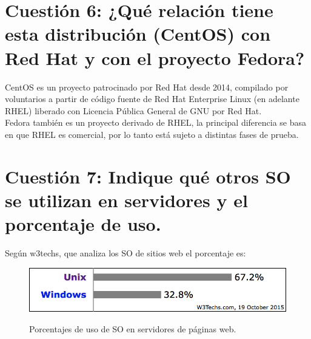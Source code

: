 \section{Cuestión 6: ¿Qué relación tiene esta distribución (CentOS) con Red Hat y con el proyecto Fedora?}
CentOS es un proyecto patrocinado por Red Hat desde 2014, compilado por voluntarios a partir de código fuente de Red Hat Enterprise Linux (en adelante RHEL) liberado con Licencia Pública General de GNU por Red Hat. \cite{19} \\
Fedora también es un proyecto derivado de RHEL, la principal diferencia se basa en que RHEL es comercial, por lo tanto está sujeto a distintas fases de prueba. \cite{20}

\section{Cuestión 7: Indique qué otros SO se utilizan en servidores y el porcentaje de uso.}

Según w3techs, que analiza los SO de sitios web el porcentaje es:
\begin{figure}[H]
\centering
\includegraphics{w3tech1}
\caption{Porcentajes de uso de SO en servidores de páginas web.}
\cite{figura1}
\end{figure}

